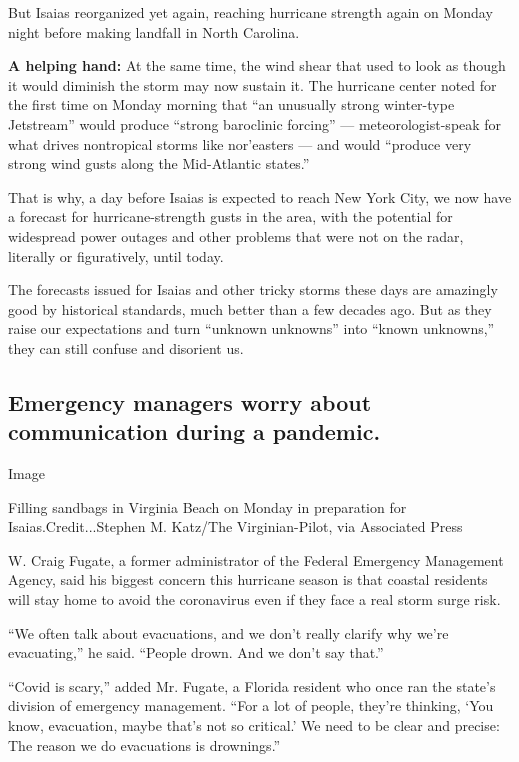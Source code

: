 But Isaias reorganized yet again, reaching hurricane strength again on
Monday night before making landfall in North Carolina.

\textbf{A helping hand:} At the same time, the wind shear that used to
look as though it would diminish the storm may now sustain it. The
hurricane center noted for the first time on Monday morning that ``an
unusually strong winter-type Jetstream'' would produce ``strong
baroclinic forcing'' --- meteorologist-speak for what drives nontropical
storms like nor'easters --- and would ``produce very strong wind gusts
along the Mid-Atlantic states.''

That is why, a day before Isaias is expected to reach New York City, we
now have a forecast for hurricane-strength gusts in the area, with the
potential for widespread power outages and other problems that were not
on the radar, literally or figuratively, until today.

The forecasts issued for Isaias and other tricky storms these days are
amazingly good by historical standards, much better than a few decades
ago. But as they raise our expectations and turn ``unknown unknowns''
into ``known unknowns,'' they can still confuse and disorient us.

\hypertarget{emergency-managers-worry-about-communication-during-a-pandemic}{%
\subsection{Emergency managers worry about communication during a
pandemic.}\label{emergency-managers-worry-about-communication-during-a-pandemic}}

Image

Filling sandbags in Virginia Beach on Monday in preparation for
Isaias.Credit...Stephen M. Katz/The Virginian-Pilot, via Associated
Press

W. Craig Fugate, a former administrator of the Federal Emergency
Management Agency, said his biggest concern this hurricane season is
that coastal residents will stay home to avoid the coronavirus even if
they face a real storm surge risk.

``We often talk about evacuations, and we don't really clarify why we're
evacuating,'' he said. ``People drown. And we don't say that.''

``Covid is scary,'' added Mr. Fugate, a Florida resident who once ran
the state's division of emergency management. ``For a lot of people,
they're thinking, `You know, evacuation, maybe that's not so critical.'
We need to be clear and precise: The reason we do evacuations is
drownings.''

